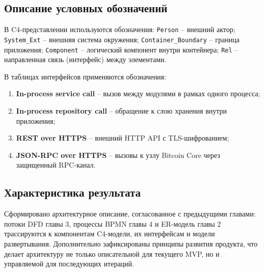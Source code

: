 ﻿\documentclass[14pt,a4paper]{extarticle}
\begin{document}
\subsection{Описание условных обозначений}
\noindent В C4-представлении используются обозначения: \texttt{Person} -- внешний актор; \texttt{System\_Ext} -- внешняя система окружения; \texttt{Container\_Boundary} -- граница приложения; \texttt{Component} -- логический компонент внутри контейнера; \texttt{Rel} -- направленная связь (интерфейс) между элементами.

\noindent В таблицах интерфейсов применяются обозначения:
\begin{enumerate}
  \item \textbf{In-process service call} -- вызов между модулями в рамках одного процесса;
  \item \textbf{In-process repository call} -- обращение к слою хранения внутри приложения;
  \item \textbf{REST over HTTPS} -- внешний HTTP API с TLS-шифрованием;
  \item \textbf{JSON-RPC over HTTPS} -- вызовы к узлу Bitcoin Core через защищенный RPC-канал.
\end{enumerate}

\subsection{Характеристика результата}
\noindent Сформировано архитектурное описание, согласованное с предыдущими главами: потоки DFD главы 3, процессы BPMN главы 4 и ER-модель главы 2 трассируются к компонентам C4-модели, их интерфейсам и модели развертывания. Дополнительно зафиксированы принципы развития продукта, что делает архитектуру не только описательной для текущего MVP, но и управляемой для последующих итераций.
\end{document}
